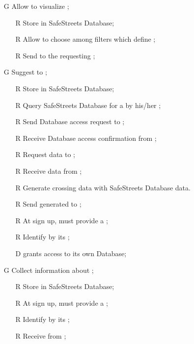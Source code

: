 \documentclass[../../../rasd.tex]{subfiles}
\begin{document}
\begin{itemize}
	\item[G\subs{5}]Allow  to visualize ;
	\begin{itemize}
		\item[R\subs{10}]Store  in SafeStreets Database;
		\item[R\subs{23}]Allow  to choose among filters which define ;
		\item[R\subs{24}]Send  to the requesting ;
	\end{itemize}

	\item[G\subs{6}]Suggest  to ;
	\begin{itemize}
		\item[R\subs{10}]Store  in SafeStreets Database;
		\item[R\subs{13}]Query SafeStreets Database for a  by his/her ;
		\item[R\subs{25}]Send  Database access request to ; 
		\item[R\subs{26}]Receive  Database access confirmation from ;
		\item[R\subs{27}]Request  data to ;
		\item[R\subs{28}]Receive  data from ;
		\item[R\subs{29}]Generate  crossing   data with SafeStreets Database data.
		\item[R\subs{30}]Send generated  to ;
		\item[R\subs{31}]At sign up,  must provide a ;
		\item[R\subs{32}]Identify  by its ;
		\\
		\item[D\subs{8}] grants access to its own  Database;
	\end{itemize}

	\item[G\subs{7}]Collect information about ;
	\begin{itemize}
		\item[R\subs{12}]Store  in SafeStreets Database;
		\item[R\subs{31}]At sign up,  must provide a ;
		\item[R\subs{32}]Identify  by its ;
		\item[R\subs{33}]Receive  from ;
	\end{itemize}


\end{itemize}
\end{document}
